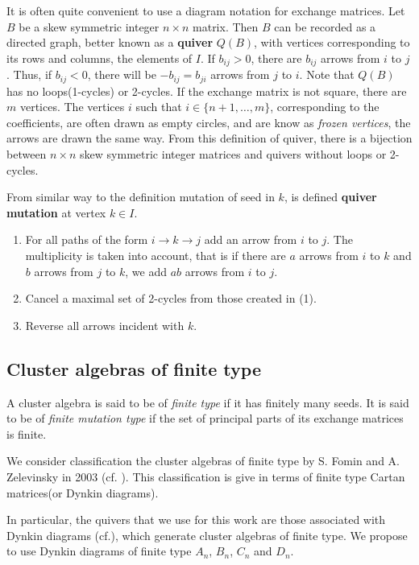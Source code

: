 \documentclass[12pt,a4paper]{article}
\begin{document}
It is often quite convenient to use a diagram notation for exchange matrices. Let $B$ be a skew symmetric integer $n \times n$ matrix. Then $B$ can be recorded as a directed graph, better known as a \textbf{quiver} $Q(B)$, with vertices corresponding to its rows and columns, the elements of $I$. If $b_{ij}>0$, there are $b_{ij}$ arrows from $i$ to $j$. Thus, if $b_{ij}<0$, there will be $-b_{ij}=b_{ji}$ arrows from $j$ to $i$. Note that $Q(B)$ has no loops(1-cycles) or 2-cycles. If the exchange matrix is not square, there are $m$ vertices. The vertices $i$ such that $i \in \lbrace n+1,\ldots,m \rbrace$, corresponding to the coefficients, are often drawn as empty circles, and are know as \textit{frozen vertices}, the arrows are drawn the same way. From this definition of quiver, there is a bijection between $n \times n$ skew symmetric integer matrices and quivers without loops or 2-cycles.

From similar way to the definition mutation of seed in $k$, is defined \textbf{quiver mutation} at vertex $k \in I$.  

\begin{enumerate}
\item For all paths of the form $i \rightarrow k \rightarrow j$ add an arrow from $i$ to $j$. The multiplicity is taken into account, that is if there are $a$ arrows from $i$ to $k$ and $b$ arrows from $j$ to $k$, we add $ab$ arrows from $i$ to $j$.

\item Cancel a maximal set of 2-cycles from those created in (1).
\item Reverse all arrows incident with $k$.
\end{enumerate}


\subsection{Cluster algebras of finite type}

A cluster algebra is said to be of \textit{finite type} if it has finitely many seeds. It is said to be of \textit{finite mutation type} if the set of principal parts of its exchange matrices is finite.  

We consider classification the cluster algebras of finite type by S. Fomin and A. Zelevinsky in 2003 (cf. \cite{fominfinito}). This classification is give in terms of finite type Cartan matrices(or Dynkin diagrams).

In particular, the quivers that we use for this work are those associated with Dynkin diagrams (cf.\cite{algebralie}), which generate cluster algebras of finite type. We propose to use Dynkin diagrams of finite type $A_n$, $B_n$, $C_n$ and $D_n$.
\end{document}
